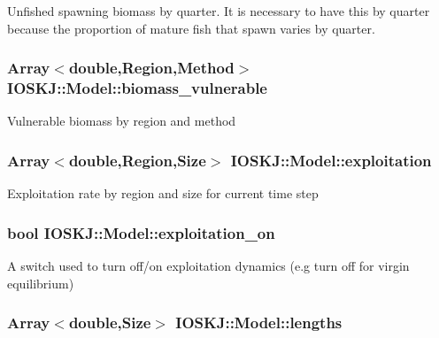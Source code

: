 Unfished spawning biomass by quarter. It is necessary to have this by quarter because the proportion of mature fish that spawn varies by quarter. \hypertarget{classIOSKJ_1_1Model_a0aa015def5316af0f5ce23bdaecbf67c}{
\subsubsection[{biomass\-\_\-vulnerable}]{\setlength{\rightskip}{0pt plus 5cm}Array$<$double,Region,Method$>$ I\-O\-S\-K\-J\-::\-Model\-::biomass\-\_\-vulnerable}}\label{classIOSKJ_1_1Model_a0aa015def5316af0f5ce23bdaecbf67c}
Vulnerable biomass by region and method \hypertarget{classIOSKJ_1_1Model_ad4379e82be5723f2e1b58e9492dde3dc}{
\subsubsection[{exploitation}]{\setlength{\rightskip}{0pt plus 5cm}Array$<$double,Region,Size$>$ I\-O\-S\-K\-J\-::\-Model\-::exploitation}}\label{classIOSKJ_1_1Model_ad4379e82be5723f2e1b58e9492dde3dc}
Exploitation rate by region and size for current time step \hypertarget{classIOSKJ_1_1Model_ab9afc5bae0ac8e16817802e54bdfa60d}{
\subsubsection[{exploitation\-\_\-on}]{\setlength{\rightskip}{0pt plus 5cm}bool I\-O\-S\-K\-J\-::\-Model\-::exploitation\-\_\-on}}\label{classIOSKJ_1_1Model_ab9afc5bae0ac8e16817802e54bdfa60d}
A switch used to turn off/on exploitation dynamics (e.\-g turn off for virgin equilibrium) \hypertarget{classIOSKJ_1_1Model_ab26d2c0b3da23a380d21bbfafa236cff}{
\subsubsection[{lengths}]{\setlength{\rightskip}{0pt plus 5cm}Array$<$double,Size$>$ I\-O\-S\-K\-J\-::\-Model\-::lengths}}\label{classIOSKJ_1_1Model_ab26d2c0b3da23a380d21bbfafa236cff}
